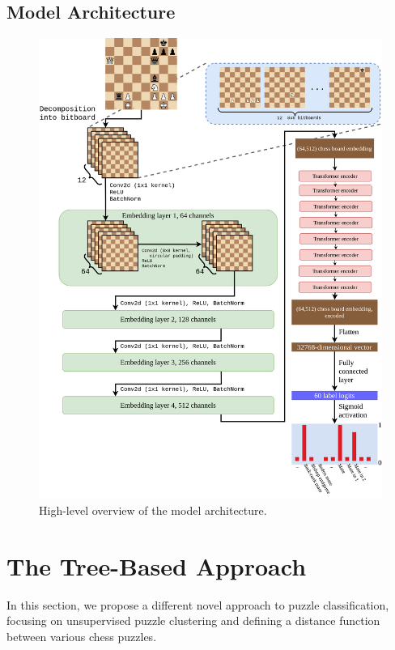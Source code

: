 \section{Model Architecture}

\begin{figure}[H]
        \centering
        \includegraphics[width=\textwidth]{project/img/ml_diagram.png}
        \caption{High-level overview of the model architecture.}
        \label{MLDiagram}
\end{figure}






\chapter{The Tree-Based Approach}\label{treeChapter}

In this section, we propose a different novel approach to puzzle
classification, focusing on unsupervised puzzle clustering and defining a
distance function between various chess puzzles.

